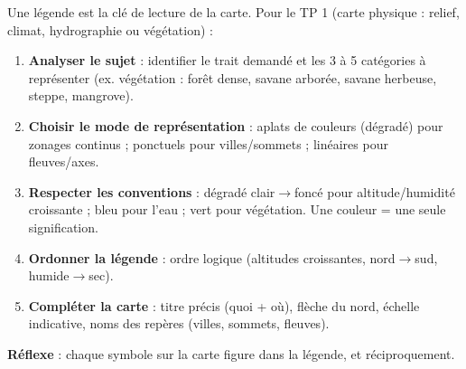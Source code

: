 \documentclass[11pt]{article}
\newcommand{\cle}[1]{{\popxbold\color{popdark}#1}}
\begin{document}
\begin{methode}
Une légende est la clé de lecture de la carte. Pour le TP 1 (carte physique : relief, climat, hydrographie ou végétation) :
\begin{enumerate}
\item \textbf{Analyser le sujet} : identifier le \cle{trait} demandé et les 3 à 5 catégories à représenter (ex. végétation : forêt dense, savane arborée, savane herbeuse, steppe, mangrove).
\item \textbf{Choisir le mode de représentation} : \cle{aplats de couleurs} (dégradé) pour zonages continus ; \cle{ponctuels} pour villes/sommets ; \cle{linéaires} pour fleuves/axes.
\item \textbf{Respecter les conventions} : dégradé clair$\to$foncé pour altitude/humidité croissante ; bleu pour l'eau ; vert pour végétation. Une couleur = une seule signification.
\item \textbf{Ordonner la légende} : ordre logique (altitudes croissantes, nord$\to$sud, humide$\to$sec).
\item \textbf{Compléter la carte} : titre précis (quoi + où), flèche du nord, échelle indicative, noms des repères (villes, sommets, fleuves).
\end{enumerate}
\textbf{Réflexe} : chaque symbole sur la carte figure dans la légende, et réciproquement.
\end{methode}
\end{document}
